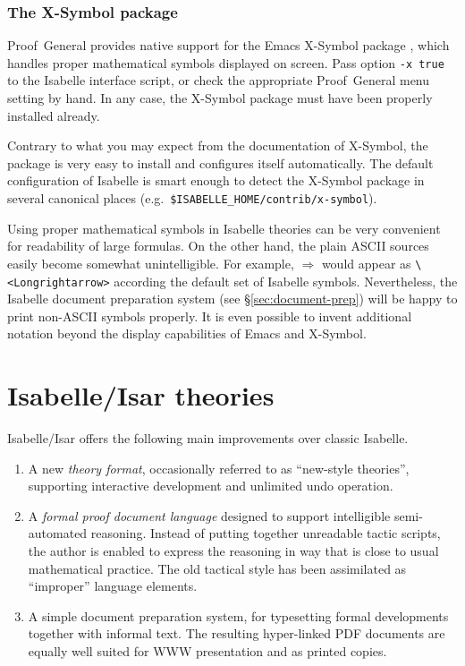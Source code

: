 \subsubsection{The X-Symbol package}

Proof~General provides native support for the Emacs X-Symbol package
\cite{x-symbol}, which handles proper mathematical symbols displayed on
screen.  Pass option \texttt{-x true} to the Isabelle interface script, or
check the appropriate Proof~General menu setting by hand.  In any case, the
X-Symbol package must have been properly installed already.

Contrary to what you may expect from the documentation of X-Symbol, the
package is very easy to install and configures itself automatically.  The
default configuration of Isabelle is smart enough to detect the X-Symbol
package in several canonical places (e.g.\ 
\texttt{\$ISABELLE_HOME/contrib/x-symbol}).

\medskip

Using proper mathematical symbols in Isabelle theories can be very convenient
for readability of large formulas.  On the other hand, the plain ASCII sources
easily become somewhat unintelligible.  For example, $\Longrightarrow$ would
appear as \verb,\<Longrightarrow>, according the default set of Isabelle
symbols.  Nevertheless, the Isabelle document preparation system (see
\S\ref{sec:document-prep}) will be happy to print non-ASCII symbols properly.
It is even possible to invent additional notation beyond the display
capabilities of Emacs and X-Symbol.


\section{Isabelle/Isar theories}

Isabelle/Isar offers the following main improvements over classic Isabelle.
\begin{enumerate}
  
\item A new \emph{theory format}, occasionally referred to as ``new-style
  theories'', supporting interactive development and unlimited undo operation.
  
\item A \emph{formal proof document language} designed to support intelligible
  semi-automated reasoning.  Instead of putting together unreadable tactic
  scripts, the author is enabled to express the reasoning in way that is close
  to usual mathematical practice.  The old tactical style has been assimilated
  as ``improper'' language elements.
  
\item A simple document preparation system, for typesetting formal
  developments together with informal text.  The resulting hyper-linked PDF
  documents are equally well suited for WWW presentation and as printed
  copies.

\end{enumerate}

